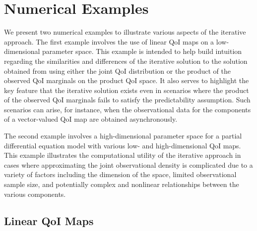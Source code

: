 \documentclass{article}
\newcounter{example}[section]
\begin{document}



\section{Numerical Examples}\label{sec:numerics}

We present two numerical examples to illustrate various aspects of the iterative approach. 
The first example involves the use of linear QoI maps on a low-dimensional parameter space.
This example is intended to help build intuition regarding the similarities and differences of the iterative solution to the solution obtained from using either the joint QoI distribution or the product of the observed QoI marginals on the product QoI space. 
It also serves to highlight the key feature that the iterative solution exists even in scenarios where the product of the observed QoI marginals fails to satisfy the predictability assumption. 
Such scenarios can arise, for instance, when the observational data for the components of a vector-valued QoI map are obtained asynchronously. 

The second example involves a high-dimensional parameter space for a partial differential equation model with various low- and high-dimensional QoI maps.
This example illustrates the computational utility of the iterative approach in cases where approximating the joint observational density is complicated due to a variety of factors including the dimension of the space, limited observational sample size, and potentially complex and nonlinear relationships between the various components. 

\subsection{Linear QoI Maps}\label{sec:example1}
\end{document}
